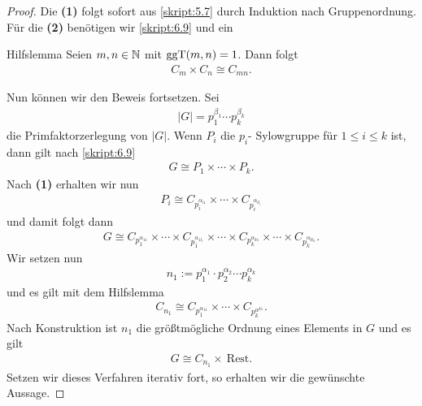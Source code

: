 \begin{proof}
	Die \textbf{(1)} folgt sofort aus \ref{skript:5.7} durch Induktion nach Gruppenordnung.
	Für die \textbf{(2)} benötigen wir \ref{skript:6.9} und ein
	\begin{genericthm}{Hilfslemma} \label{skript:5.9}
		Seien $ m,n \in \mathbb{N} $ mit $ \operatorname{ggT}(m,n) = 1 $.
		Dann folgt
		\begin{align*}
		C_m \times C_n \cong C_{mn}.
		\end{align*}
	\end{genericthm}
	Nun können wir den Beweis fortsetzen.
	Sei 
	\begin{align*}
	|G| = p_1^{\beta_1}\cdots p_k^{\beta_k}
	\end{align*}
	die Primfaktorzerlegung von $ |G| $. Wenn $ P_i $ die $ p_i $- Sylowgruppe für $ 1 \leq i \leq k $ ist, dann gilt nach \ref{skript:6.9}
	\begin{align*}
	G \cong P_1 \times \cdots \times P_k.
	\end{align*}
	Nach \textbf{(1)} erhalten wir nun 
	\begin{align*}
	P_i \cong C_{p_i^{\alpha_{i1}}} \times \cdots \times C_{p_i^{\alpha_{i l_i}}}
	\end{align*}
	und damit folgt dann
	\begin{align*}
	G \cong C_{p_1^{\alpha_{11}}} \times \cdots \times C_{p_1^{\alpha_{1 l_1}}}
	\times \cdots \times C_{p_k^{\alpha_{k1}}} \times \cdots \times C_{p_k^{\alpha_{k l_k}}}.
	\end{align*}
	Wir setzen nun 
	\begin{align*}
	n_1 := p_1^{\alpha_1} \cdot p_2^{\alpha_2} \cdots p_k^{\alpha_k}
	\end{align*}
	und es gilt mit dem Hilfslemma
	\begin{align*}
	C_{n_1} \cong C_{p_1^{\alpha_{11}}} \times \cdots \times C_{p_k^{\alpha^{k1}}}.
	\end{align*}
	Nach Konstruktion ist $ n_1 $ die größtmögliche Ordnung eines Elements in $ G $ und es gilt
	\begin{align*}
	G \cong C_{n_1} \times \ \text{Rest} .
	\end{align*}
	Setzen wir dieses Verfahren iterativ fort, so erhalten wir die gewünschte Aussage.
\end{proof}

